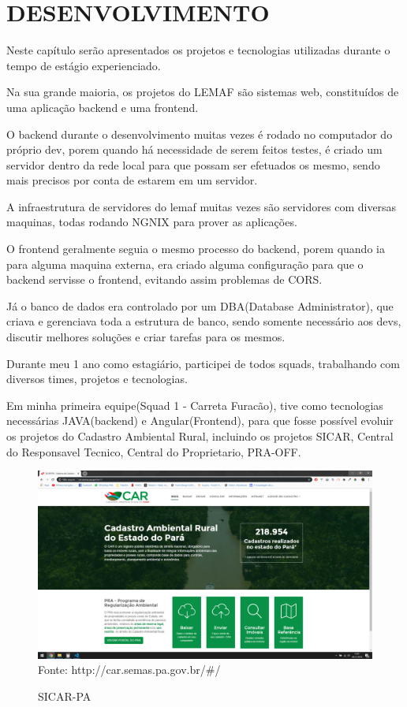 \chapter{DESENVOLVIMENTO}
\label{cap:desenvolvimento}

Neste capítulo serão apresentados os projetos e tecnologias utilizadas durante o tempo de estágio experienciado.

Na sua grande maioria, os projetos do LEMAF são sistemas web, constituídos de uma aplicação backend e uma frontend.

O backend durante o desenvolvimento muitas vezes é rodado no computador do próprio dev, porem quando há necessidade de serem feitos testes, é criado um servidor dentro da rede local para que possam ser efetuados os mesmo, sendo mais precisos por conta de estarem em um servidor.

A infraestrutura de servidores do lemaf muitas vezes são servidores com diversas maquinas, todas rodando NGNIX para prover as aplicações.

O frontend geralmente seguia o mesmo processo do backend, porem quando ia para alguma maquina externa, era criado alguma configuração para que o backend servisse o frontend, evitando assim problemas de CORS.

Já o banco de dados era controlado por um DBA(Database Administrator), que criava e gerenciava toda a estrutura de banco, sendo somente necessário aos devs, discutir melhores soluções e criar tarefas para os mesmos.

Durante meu 1 ano como estagiário, participei de todos squads, trabalhando com diversos times, projetos e tecnologias.

Em minha primeira equipe(Squad 1 - Carreta Furacão), tive como tecnologias necessárias JAVA(backend) e Angular(Frontend), para que fosse possível evoluir os projetos do Cadastro Ambiental Rural, incluindo os projetos SICAR, Central do Responsavel Tecnico, Central do Proprietario, PRA-OFF.

\begin{figure}[H]
\centering
\caption{SICAR-PA} %
\includegraphics[scale=0.3]{SICAR}\\  %
{\small Fonte: http://car.semas.pa.gov.br/#/} %
\label{fig:exemplo} %
\end{figure}

